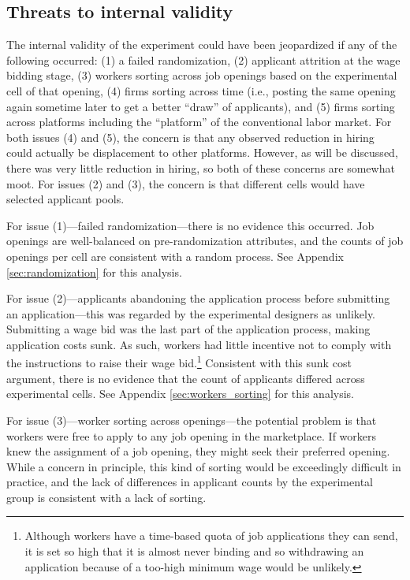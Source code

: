 \documentclass[AER]{AEA}
\begin{document}
\subsection{Threats to internal validity} \label{sec:internal_validity}
The internal validity of the experiment could have been jeopardized if any of the following occurred: 
(1) a failed randomization,
(2) applicant attrition at the wage bidding stage,
(3) workers sorting across job openings based on the experimental cell of that opening,
(4) firms sorting across time (i.e., posting the same opening again sometime later to get a better ``draw'' of applicants), and
(5) firms sorting across platforms including the ``platform'' of the conventional labor market.
For both issues (4) and (5), the concern is that any observed reduction in hiring could actually be displacement to other platforms. 
However, as will be discussed, there was very little reduction in hiring, so both of these concerns are somewhat moot.  
For issues (2) and (3), the concern is that different cells would have selected applicant pools. 


For issue (1)---failed randomization---there is no evidence this occurred. 
Job openings are well-balanced on pre-randomization attributes, and the counts of job openings per cell are consistent with a random process. 
See Appendix \ref{sec:randomization} for this analysis.  


For issue (2)---applicants abandoning the application process before submitting an application---this was regarded by the experimental designers as unlikely.
Submitting a wage bid was the last part of the application process, making application costs sunk.
As such, workers had little incentive not to comply with the instructions to raise their wage bid.\footnote{
  Although workers have a time-based quota of job applications they can send, it is set so high that it is almost never binding and so withdrawing an application because of a too-high minimum wage would be unlikely. 
}
Consistent with this sunk cost argument, there is no evidence that the count of applicants differed across experimental cells.
See Appendix \ref{sec:workers_sorting} for this analysis.


For issue (3)---worker sorting across openings---the potential problem is that workers were free to apply to any job opening in the marketplace. If workers knew the assignment of a job opening, they might seek their preferred opening. 
While a concern in principle, this kind of sorting would be exceedingly difficult in practice, and the lack of differences in applicant counts by the experimental group is consistent with a lack of sorting. 
\end{document}
